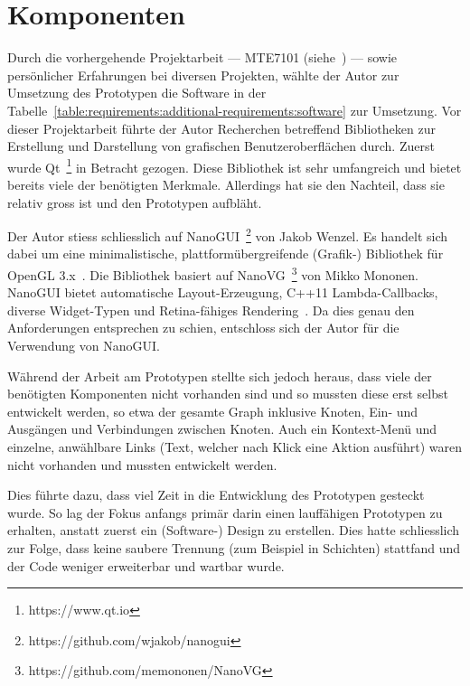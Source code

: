 
\section{Komponenten}
\label{sec:prototype:components}

Durch die vorhergehende Projektarbeit --- MTE7101
(siehe~\cite{osterwalder_sven_volume_2016}) --- sowie persönlicher Erfahrungen
bei diversen Projekten, wählte der Autor zur Umsetzung des Prototypen die
Software in der
Tabelle~\ref{table:requirements:additional-requirements:software} zur
Umsetzung. Vor dieser Projektarbeit führte der Autor Recherchen betreffend
Bibliotheken zur Erstellung und Darstellung von grafischen Benutzeroberflächen
durch. Zuerst wurde Qt~\footnote{https://www.qt.io} in Betracht gezogen. Diese
Bibliothek ist sehr umfangreich und bietet bereits viele der benötigten
Merkmale. Allerdings hat sie den Nachteil, dass sie relativ gross ist und den
Prototypen aufbläht.

Der Autor stiess schliesslich auf
NanoGUI~\footnote{https://github.com/wjakob/nanogui} von Jakob Wenzel. Es
handelt sich dabei um eine minimalistische, plattformübergreifende (Grafik-)
Bibliothek für OpenGL 3.x~\cite{jakob_wenzel_wjakob/nanogui:_2016}.  Die
Bibliothek basiert auf NanoVG~\footnote{https://github.com/memononen/NanoVG}
von Mikko Mononen. NanoGUI bietet automatische Layout-Erzeugung, C++11
Lambda-Callbacks, diverse Widget-Typen und Retina-fähiges
Rendering~\cite{jakob_wenzel_wjakob/nanogui:_2016}. Da dies genau den
Anforderungen entsprechen zu schien, entschloss sich der Autor für die
Verwendung von NanoGUI.\@

Während der Arbeit am Prototypen stellte sich jedoch heraus, dass viele der
benötigten Komponenten nicht vorhanden sind und so mussten diese erst selbst
entwickelt werden, so etwa der gesamte Graph inklusive Knoten, Ein- und
Ausgängen und Verbindungen zwischen Knoten. Auch ein Kontext-Menü und einzelne,
anwählbare Links (Text, welcher nach Klick eine Aktion ausführt) waren nicht
vorhanden und mussten entwickelt werden.

Dies führte dazu, dass viel Zeit in die Entwicklung des Prototypen gesteckt
wurde. So lag der Fokus anfangs primär darin einen lauffähigen Prototypen zu
erhalten, anstatt zuerst ein (Software-) Design zu erstellen. Dies hatte
schliesslich zur Folge, dass keine saubere Trennung (zum Beispiel in Schichten)
stattfand und der Code weniger erweiterbar und wartbar wurde.

